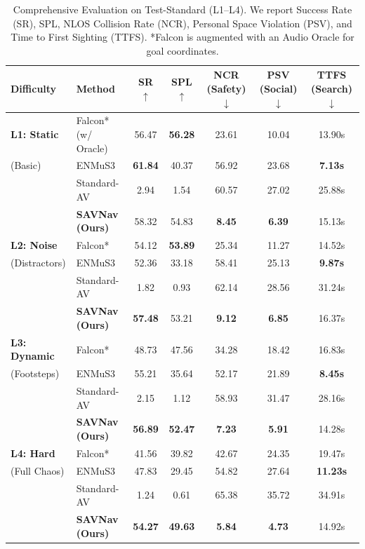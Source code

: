 \begin{table}[t]
\caption{Comprehensive Evaluation on Test-Standard (L1--L4). We report Success Rate (SR), SPL, NLOS Collision Rate (NCR), Personal Space Violation (PSV), and Time to First Sighting (TTFS). *Falcon is augmented with an Audio Oracle for goal coordinates.}
\label{tab:comprehensive_results}
\centering
\begin{tabular}{l|l||c c|c c c}
\hline
\textbf{Difficulty} & \textbf{Method} & \textbf{SR} $\uparrow$ & \textbf{SPL} $\uparrow$ & \textbf{NCR} (Safety) $\downarrow$ & \textbf{PSV} (Social) $\downarrow$ & \textbf{TTFS} (Search) $\downarrow$ \\
\hline
\hline
\textbf{L1: Static} & Falcon* (w/ Oracle) & 56.47 & \textbf{56.28} & 23.61 & 10.04 & 13.90s \\
(Basic) & ENMuS3 & \textbf{61.84} & 40.37 & 56.92 & 23.68 & \textbf{7.13s}\\
 & Standard-AV & 2.94 & 1.54 & 60.57 & 27.02 &  25.88s  \\
 & \textbf{SAVNav (Ours)} & 58.32 & 54.83 & \textbf{8.45} & \textbf{6.39} & 15.13s \\
\hline
\textbf{L2: Noise} & Falcon* & 54.12 & \textbf{53.89} & 25.34 & 11.27 & 14.52s \\
(Distractors) & ENMuS3 & 52.36 & 33.18 & 58.41 & 25.13 & \textbf{9.87s} \\
 & Standard-AV & 1.82 & 0.93 & 62.14 & 28.56 & 31.24s \\
 & \textbf{SAVNav (Ours)} & \textbf{57.48} & 53.21 & \textbf{9.12} & \textbf{6.85} & 16.37s \\
\hline
\textbf{L3: Dynamic} & Falcon* & 48.73 & 47.56 & 34.28 & 18.42 & 16.83s \\
(Footsteps) & ENMuS3 & 55.21 & 35.64 & 52.17 & 21.89 & \textbf{8.45s} \\
 & Standard-AV & 2.15 & 1.12 & 58.93 & 31.47 & 28.16s \\
 & \textbf{SAVNav (Ours)} & \textbf{56.89} & \textbf{52.47} & \textbf{7.23} & \textbf{5.91} & 14.28s \\
\hline
\textbf{L4: Hard} & Falcon* & 41.56 & 39.82 & 42.67 & 24.35 & 19.47s \\
(Full Chaos) & ENMuS3 & 47.83 & 29.45 & 54.82 & 27.64 & \textbf{11.23s} \\
 & Standard-AV & 1.24 & 0.61 & 65.38 & 35.72 & 34.91s \\
 & \textbf{SAVNav (Ours)} & \textbf{54.27} & \textbf{49.63} & \textbf{5.84} & \textbf{4.73} & 14.92s \\
\hline
\end{tabular}
\end{table}


